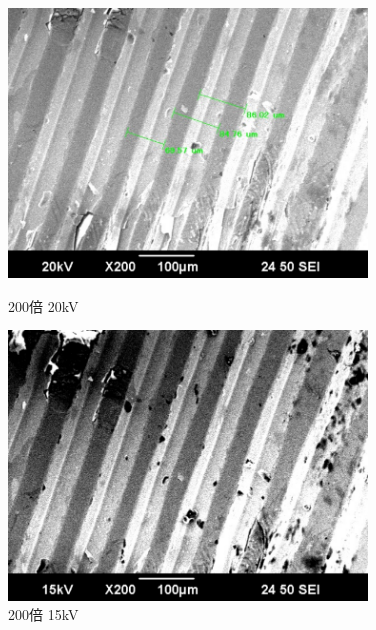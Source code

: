 \documentclass[a4paper,11pt]{jsarticle}
\begin{document}
\begin{figure}[H]
  \begin{minipage}{0.5\hsize}
    \begin{center}
      \includegraphics[width=0.85\textwidth]{figs/0523/record2/record_200_20kV.pdf}
    \end{center}
    \caption{200倍 20kV}
  \end{minipage}
  \begin{minipage}{0.5\hsize}
    \begin{center}
      \includegraphics[width=0.85\textwidth]{figs/0523/record/200_15kV.pdf}
    \end{center}
    \caption{200倍 15kV}
  \end{minipage}
\end{figure}
\end{document}
